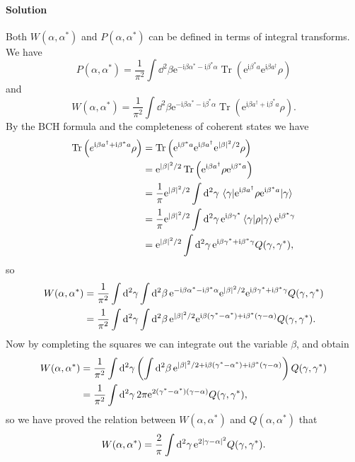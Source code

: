 \documentclass[hyperref, a4paper]{article}
\newcommand*{\ii}{\mathrm{i}}
\newcommand*{\ee}{\mathrm{e}}
\begin{document}
\paragraph{Solution} Both $W(\alpha, \alpha^*)$ and $P(\alpha, \alpha^*)$ can be defined in terms of integral transforms. We have
\[
    P\left(\alpha, \alpha^{*}\right)=\frac{1}{\pi^{2}} \int \dd^{2} \beta \ee^{- \ii \beta \alpha^{*}- \ii \beta^{*} \alpha} \operatorname{Tr}\left(\ee^{\ii \beta^{*} a} \ee^{\ii \beta a^{\dagger}} \rho\right)
\]
and
\[
    W\left(\alpha, \alpha^{*}\right)=\frac{1}{\pi^{2}} \int \dd^{2} \beta \ee^{-\ii \beta \alpha^{*}- \ii \beta^{*} \alpha} \operatorname{Tr}\left(\ee^{\ii \beta a^{\dagger}+ \ii \beta^{*} a} \rho\right).
\]
By the BCH formula and the completeness of coherent states we have
\[
    \begin{aligned}
        \operatorname{Tr}\left(e^{\ii \beta a^{\dagger}+ \ii \beta^{*} a} \rho\right) &= \operatorname{Tr}\left(\ee^{\ii \beta^* a} \ee^{\ii \beta a^{\dagger}} \ee^{\abs*{\beta}^2 / 2} \rho\right) \\
        &= \ee^{\abs*{\beta}^2 / 2} \operatorname{Tr}\left( \ee^{\ii \beta a^{\dagger}} \rho \ee^{\ii \beta^* a}\right) \\
        &= \frac{1}{\pi} \ee^{\abs*{\beta}^2 / 2} \int \dd[2]{\gamma} \mel{\gamma}{\ee^{\ii \beta a^{\dagger}} \rho \ee^{\ii \beta^* a}}{\gamma} \\
        &= \frac{1}{\pi} \ee^{\abs*{\beta}^2 / 2} \int \dd[2]{\gamma} \ee^{\ii \beta \gamma^{*}} \mel{\gamma}{ \rho }{\gamma} \ee^{\ii \beta^* \gamma} \\
        &= \ee^{\abs*{\beta}^2 / 2} \int \dd[2]{\gamma} \ee^{\ii \beta \gamma^{*} + \ii \beta^* \gamma} Q(\gamma, \gamma^*) ,
    \end{aligned}
\]
so 
\[
    \begin{aligned}
        W(\alpha, \alpha^*) &= \frac{1}{\pi^{2}} \int \dd[2]{\gamma} \int \dd[2]{\beta} \ee^{-\ii \beta \alpha^{*}- \ii \beta^{*} \alpha}  \ee^{\abs*{\beta}^2 / 2} \ee^{\ii \beta \gamma^{*} + \ii \beta^* \gamma} Q(\gamma, \gamma^*)  \\
        &= \frac{1}{\pi^2} \int \dd[2]{\gamma} \int \dd[2]{\beta} \ee^{\abs*{\beta}^2 / 2} \ee^{\ii \beta (\gamma^{*} - \alpha^*) + \ii \beta^* (\gamma - \alpha)} Q(\gamma, \gamma^*).
    \end{aligned}
\]
Now by completing the squares we can integrate out the variable $\beta$, and obtain 
\[
    \begin{aligned}
        W(\alpha, \alpha^*) &= \frac{1}{\pi^2} \int \dd[2]{\gamma} \left( \int \dd[2]{\beta} \ee^{\abs*{\beta}^2 / 2 + \ii \beta (\gamma^{*} - \alpha^*) + \ii \beta^* (\gamma - \alpha)} \right) Q(\gamma, \gamma^*) \\
        &= \frac{1}{\pi^2} \int \dd[2]{\gamma} 2 \pi \ee^{2 (\gamma^* - \alpha^*) (\gamma - \alpha)} Q(\gamma, \gamma^*) ,
    \end{aligned}
\]
so we have proved the relation between $W(\alpha, \alpha^*)$ and $Q(\alpha, \alpha^*)$ that
\begin{equation}
    W(\alpha, \alpha^*) = \frac{2}{\pi} \int \dd[2]{\gamma} \ee^{2 \abs{\gamma - \alpha}^2} Q(\gamma, \gamma^*).
    \label{eq:scully-3-3-relation-w-q}
\end{equation}
\end{document}
